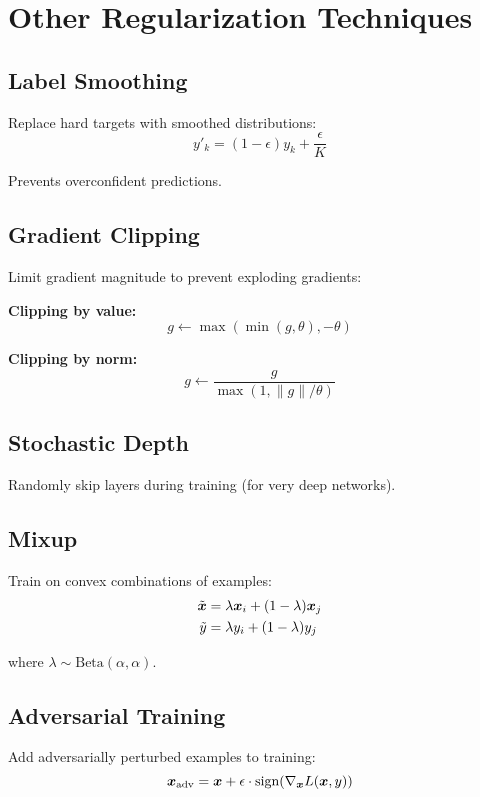 
\section{Other Regularization Techniques}
\label{sec:other-regularization}

\subsection{Label Smoothing}

Replace hard targets with smoothed distributions:
\begin{equation}
y'_k = (1 - \epsilon) y_k + \frac{\epsilon}{K}
\end{equation}

Prevents overconfident predictions.

\subsection{Gradient Clipping}

Limit gradient magnitude to prevent exploding gradients:

\textbf{Clipping by value:}
\begin{equation}
g \leftarrow \max(\min(g, \theta), -\theta)
\end{equation}

\textbf{Clipping by norm:}
\begin{equation}
g \leftarrow \frac{g}{\max(1, \|g\| / \theta)}
\end{equation}

\subsection{Stochastic Depth}

Randomly skip layers during training (for very deep networks).

\subsection{Mixup}

Train on convex combinations of examples:
\begin{align}
\tilde{\boldsymbol{x}} &= \lambda \boldsymbol{x}_i + (1-\lambda) \boldsymbol{x}_j \\
\tilde{y} &= \lambda y_i + (1-\lambda) y_j
\end{align}

where $\lambda \sim \text{Beta}(\alpha, \alpha)$.

\subsection{Adversarial Training}

Add adversarially perturbed examples to training:
\begin{equation}
\boldsymbol{x}_{\text{adv}} = \boldsymbol{x} + \epsilon \cdot \text{sign}(\nabla_{\boldsymbol{x}} L(\boldsymbol{x}, y))
\end{equation}


